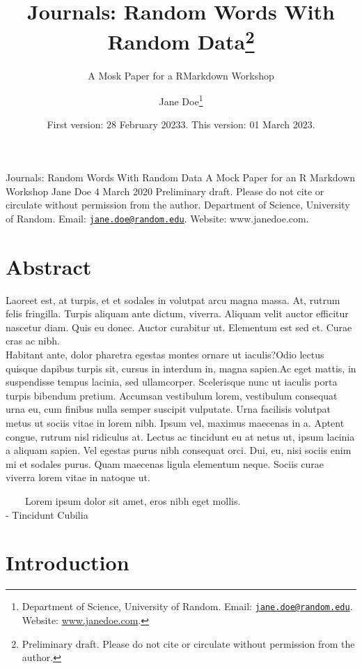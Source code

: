 \documentclass[
  12,
]{article}
\title{Journals: Random Words With Random Data\footnote{Preliminary
  draft. Please do not cite or circulate without permission from the
  author.}}
\subtitle{A Mosk Paper for a RMarkdown Workshop}
\author{Jane Doe\footnote{Department of Science, University of Random.
  Email:
  \href{mailto:jane.doe@random.edu}{\nolinkurl{jane.doe@random.edu}}.
  Website: \href{https://www.janedoe.com}{www.janedoe.com}.}}
\date{First version: 28 February 20233. This version: 01 March 2023.}
\begin{document}
\maketitle

Journals: Random Words With Random Data A Mock Paper for an R Markdown
Workshop Jane Doe 4 March 2020 Preliminary draft. Please do not cite or
circulate without permission from the author. Department of Science,
University of Random. Email:
\href{mailto:jane.doe@random.edu}{\nolinkurl{jane.doe@random.edu}}.
Website: www.janedoe.com.

\hypertarget{abstract}{%
\section*{Abstract}\label{abstract}}

Laoreet est, at turpis, et et sodales in volutpat arcu magna massa. At,
rutrum felis fringilla. Turpis aliquam ante dictum, viverra. Aliquam
velit auctor efficitur nascetur diam. Quis eu donec. Auctor curabitur
ut. Elementum est sed et. Curae cras ac nibh.\\
Habitant ante, dolor pharetra egestas montes ornare ut iaculis?Odio
lectus quisque dapibus turpis sit, cursus in interdum in, magna
sapien.Ac eget mattis, in suspendisse tempus lacinia, sed ullamcorper.
Scelerisque nunc ut iaculis porta turpis bibendum pretium. Accumsan
vestibulum lorem, vestibulum consequat urna eu, cum finibus nulla semper
suscipit vulputate. Urna facilisis volutpat metus ut sociis vitae in
lorem nibh. Ipsum vel, maximus maecenas in a. Aptent congue, rutrum nisl
ridiculus at. Lectus ac tincidunt eu at netus ut, ipsum lacinia a
aliquam sapien. Vel egestas purus nibh consequat orci. Dui, eu, nisi
sociis enim mi et sodales purus. Quam maecenas ligula elementum neque.
Sociis curae viverra lorem vitae in natoque ut.

~~~~Lorem ipsum dolor sit amet, eros nibh eget mollis.\\
\hspace*{0.333em}\hspace*{0.333em}\hspace*{0.333em}\hspace*{0.333em}-
Tincidunt Cubilia

\hypertarget{introduction}{%
\section{Introduction}\label{introduction}}
\end{document}
